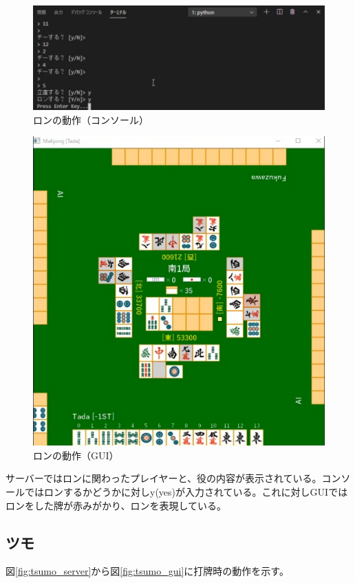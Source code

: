 \documentclass[a4j,titlepage]{jsarticle}
\begin{document}
\begin{figure}[H]
  \centering
  \includegraphics[scale = 0.5]{images/ron_console.png}
  \caption{ロンの動作（コンソール）}
  \label{fig:ron_console}
\end{figure}

\begin{figure}[H]
  \centering
  \includegraphics[scale = 0.8]{images/ron_gui.png}
  \caption{ロンの動作（GUI）}
  \label{fig:ron_gui}
\end{figure}

サーバーではロンに関わったプレイヤーと、役の内容が表示されている。コンソールではロンするかどうかに対しy(yes)が入力されている。これに対しGUIではロンをした牌が赤みがかり、ロンを表現している。

\subsection{ツモ}
図\ref{fig:tsumo_server}から図\ref{fig:tsumo_gui}に打牌時の動作を示す。
\end{document}
